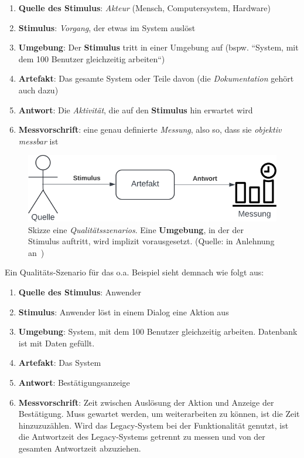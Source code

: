 \begin{enumerate}
    \item \textbf{Quelle des Stimulus}: \textit{Akteur} (Mensch, Computersystem, Hardware)
    \item \textbf{Stimulus}: \textit{Vorgang}, der etwas im System auslöst
    \item \textbf{Umgebung}: Der \textbf{Stimulus} tritt in einer Umgebung auf (bspw. ``System, mit dem 100 Benutzer gleichzeitig arbeiten``)
    \item \textbf{Artefakt}: Das gesamte System oder Teile davon (die \textit{Dokumentation} gehört auch dazu)
    \item \textbf{Antwort}: Die \textit{Aktivität}, die auf den \textbf{Stimulus} hin erwartet wird
    \item \textbf{Messvorschrift}: eine genau definierte \textit{Messung}, also so, dass sie \textit{objektiv messbar} ist
\end{enumerate}


\begin{figure}
    \centering
    \includegraphics[scale=0.4]{part four/Qualität/img/qualitätsszenario}
    \caption{Skizze eine \textit{Qualitätsszenarios}. Eine \textbf{Umgebung}, in der der Stimulus auftritt, wird implizit vorausgesetzt. (Quelle: in Anlehnung an~\cite[Abb. 1.2, 4]{Wed09c})}
    \label{fig:qualitätsszenario}
\end{figure}


\noindent
Ein Qualitäts-Szenario für das o.a. Beispiel sieht demnach wie folgt aus:

\begin{enumerate}
    \item \textbf{Quelle des Stimulus}: Anwender
    \item \textbf{Stimulus}: Anwender löst in einem Dialog eine Aktion aus
    \item \textbf{Umgebung}: System, mit dem 100 Benutzer gleichzeitig arbeiten. Datenbank ist mit Daten gefüllt.
    \item \textbf{Artefakt}: Das System
    \item \textbf{Antwort}: Bestätigungsanzeige
    \item \textbf{Messvorschrift}: Zeit zwischen Auslösung der Aktion und Anzeige der Bestätigung. Muss gewartet werden, um weiterarbeiten zu können, ist die Zeit hinzuzuzählen. Wird das Legacy-System bei der Funktionalität genutzt, ist die Antwortzeit des Legacy-Systems getrennt zu messen und von der gesamten Antwortzeit abzuziehen.
\end{enumerate}

